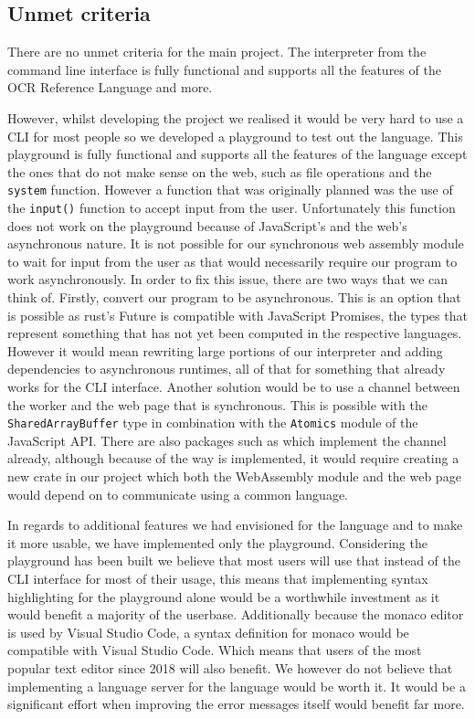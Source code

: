 \documentclass{article}
\begin{document}
\subsection{Unmet criteria}

There are no unmet criteria for the main project. The interpreter from the
command line interface is fully functional and supports all the features of the
OCR Reference Language and more.

However, whilst developing the project we realised it would be very hard to use
a CLI for most people so we developed a playground to test out the language.
This playground is fully functional and supports all the features of the
language except the ones that do not make sense on the web, such as file
operations and the \texttt{system} function. However a function that was
originally planned was the use of the \texttt{input()} function to accept input
from the user.  Unfortunately this function does not work on the playground
because of JavaScript's and the web's asynchronous nature. It is not possible
for our synchronous web assembly module to wait for input from the user as that
would necessarily require our program to work asynchronously. In order to fix
this issue, there are two ways that we can think of. Firstly, convert our
program to be asynchronous. This is an option that is possible as rust's Future
is compatible with JavaScript Promises, the types that represent something that
has not yet been computed in the respective languages. However it would mean
rewriting large portions of our interpreter and adding dependencies to
asynchronous runtimes, all of that for something that already works for the CLI
interface. Another solution would be to use a channel between the worker and the
web page that is synchronous. This is possible with the
\texttt{SharedArrayBuffer} type in combination with the \texttt{Atomics} module
of the JavaScript API. There are also packages such as
 which implement the channel already, although because
of the way  is implemented, it would require creating
a new crate in our project which both the WebAssembly module and the web page
would depend on to communicate using a common language.

In regards to additional features we had envisioned for the language and to
make it more usable, we have implemented only the playground. Considering the
playground has been built we believe that most users will use that instead of
the CLI interface for most of their usage, this means that implementing syntax
highlighting for the playground alone would be a worthwhile investment as it
would benefit a majority of the userbase. Additionally because the monaco
editor is used by Visual Studio Code, a syntax definition for monaco would be
compatible with Visual Studio Code. Which means that users of the most popular
text editor since 2018 will also benefit. We however do not believe that
implementing a language server for the language would be worth it. It would be
a significant effort when improving the error messages itself would benefit far
more.
\end{document}
